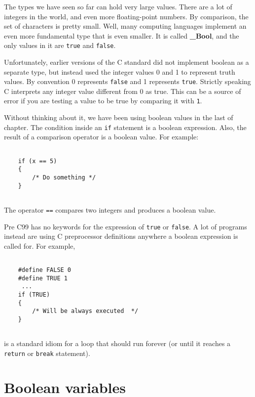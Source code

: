 The types we have seen so far can hold very large values.  There are a lot
of integers in the world, and even more floating-point numbers.
By comparison, the set of characters is pretty small.  Well, many computing
languages implement an even more fundamental type that is even smaller.  It is called
{\bf \_Bool}, and the only values in it are {\tt true} and {\tt false}.

Unfortunately, earlier versions of the C standard did not implement boolean as
a separate type, but instead used the integer values 0 and 1 to represent 
truth values. By convention 0 represents {\tt false} and 1 represents {\tt true}. 
Strictly speaking C interprets any integer value different from 0 as true. This
can be a source of error if you are testing a value to be true by comparing it with {\tt 1}.

%

Without thinking about it, we have been using boolean values in the
last of chapter.  The condition inside an {\tt if}
statement is a boolean expression.
Also, the result of a comparison operator is a boolean value.
For example:

\begin{verbatim}

    if (x == 5) 
    {
        /* Do something */
    }
    
\end{verbatim}
%
The operator {\tt ==} compares two integers and produces a
boolean value.


Pre C99 has no keywords for the expression of {\tt true} or {\tt false}.
A lot of programs instead are
using C preprocessor definitions anywhere a boolean expression is called for.
For example, 

\begin{verbatim}

    #define FALSE 0
    #define TRUE 1
     ...
    if (TRUE) 
    {
        /* Will be always executed  */
    }
    
\end{verbatim}
%
is a standard idiom for a loop that should run forever (or
until it reaches a {\tt return} or {\tt break} statement).

\section{Boolean variables}

